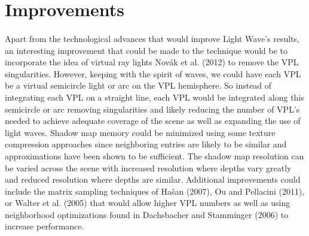 \section{Improvements}
\paragraph{}
Apart from the technological advances that would improve Light Wave's results, an interesting improvement that could be made to the technique would be to incorporate the idea of virtual ray lights Novák et al. (2012) to remove the VPL singularities.  However, keeping with the spirit of waves, we could have each VPL be a virtual semicircle light or arc on the VPL hemisphere.  So instead of integrating each VPL on a straight line, each VPL would be integrated along this semicircle or arc removing singularities and likely reducing the number of VPL's needed to achieve adequate coverage of the scene as well as expanding the use of light waves.  Shadow map memory could be minimized using some texture compression approaches since neighboring entries are likely to be similar and approximations have been shown to be sufficient.  The shadow map resolution can be varied across the scene with increased resolution where depths vary greatly and reduced resolution where depths are similar.  Additional improvements could include the matrix sampling techniques of Hašan (2007), Ou and Pellacini (2011), or Walter et al. (2005) that would allow higher VPL numbers as well as using neighborhood optimizations found in Dachsbacher and Stamminger (2006) to increase performance.
